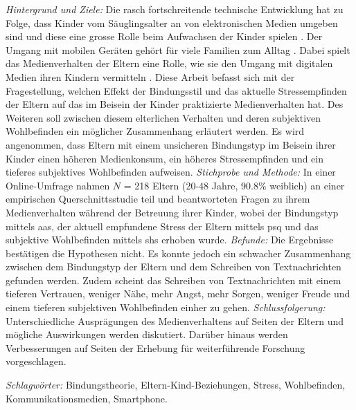 \begin{flushleft}
\textit{Hintergrund und Ziele:} Die rasch fortschreitende technische Entwicklung hat zu Folge, dass Kinder vom Säuglingsalter an von elektronischen Medien umgeben sind und diese eine grosse Rolle beim Aufwachsen der Kinder spielen \cite{Feierabend2015}. Der Umgang mit mobilen Geräten gehört für viele Familien zum Alltag \cite{Wagner2016}. Dabei spielt das Medienverhalten der Eltern eine Rolle, wie sie den Umgang mit digitalen Medien ihren Kindern vermitteln \cite{Livingstone2015a}. Diese Arbeit befasst sich mit der Fragestellung, welchen Effekt der Bindungsstil und das aktuelle Stressempfinden der Eltern auf das im Beisein der Kinder praktizierte Medienverhalten hat. Des Weiteren soll zwischen diesem elterlichen Verhalten und deren subjektiven Wohlbefinden ein möglicher Zusammenhang erläutert werden. Es wird angenommen, dass Eltern mit einem unsicheren Bindungstyp im Beisein ihrer Kinder einen höheren Medienkonsum, ein höheres Stressempfinden und ein tieferes subjektives Wohlbefinden aufweisen. \textit{Stichprobe und Methode:} In einer Online-Umfrage nahmen $N$ = 218 Eltern (20-48 Jahre, 90.8\% weiblich) an einer empirischen Querschnittsstudie teil und beantworteten Fragen zu ihrem Medienverhalten während der Betreuung ihrer Kinder, wobei der Bindungstyp mittels \acrfull{aas}, der aktuell empfundene Stress der Eltern mittels \acrfull{psq} und das subjektive Wohlbefinden mittels \acrfull{shs} erhoben wurde. 
\textit{Befunde:} Die Ergebnisse bestätigen die Hypothesen nicht. Es konnte jedoch ein schwacher Zusammenhang zwischen dem Bindungstyp der Eltern und dem Schreiben von Textnachrichten gefunden werden. Zudem scheint das Schreiben von Textnachrichten mit einem tieferen Vertrauen, weniger Nähe, mehr Angst, mehr Sorgen, weniger Freude und einem tieferen subjektiven Wohlbefinden einher zu gehen. 
\textit{Schlussfolgerung:} Unterschiedliche Ausprägungen des Medienverhaltens auf Seiten der Eltern und mögliche Auswirkungen werden diskutiert. Darüber hinaus werden Verbesserungen auf Seiten der Erhebung für weiterführende Forschung vorgeschlagen. \linebreak


\textit{Schlagwörter:} Bindungstheorie, Eltern-Kind-Beziehungen, Stress, Wohlbefinden, Kommunikationsmedien, Smartphone.

\end{flushleft}
